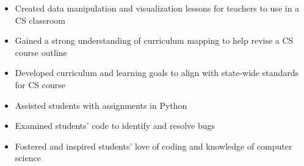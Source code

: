 \documentclass[
	a4paper,
]{fortysecondscv}
\begin{document}
\begin{cvtable}[1.5]
	\vspace{5mm}
		{\vspace{-3mm}\begin{itemize}[noitemsep, topsep=0pt]
		\item Created data manipulation and visualization lessons for teachers to use in a CS classroom
		\item Gained a strong understanding of curriculum mapping to help revise a CS course outline
		\item Developed curriculum and learning goals to align with state-wide standards for CS course
		\end{itemize}}
	
	\vspace{5mm}
		{\vspace{-3mm}\begin{itemize}[noitemsep, topsep=0pt]
		\item Assisted students with assignments in Python
		\item Examined students' code to identify and resolve bugs
		\item Fostered and inspired students' love of coding and knowledge of computer science
		\end{itemize}}
\end{cvtable}


\begin{cvtable}
\end{cvtable}
\end{document}
